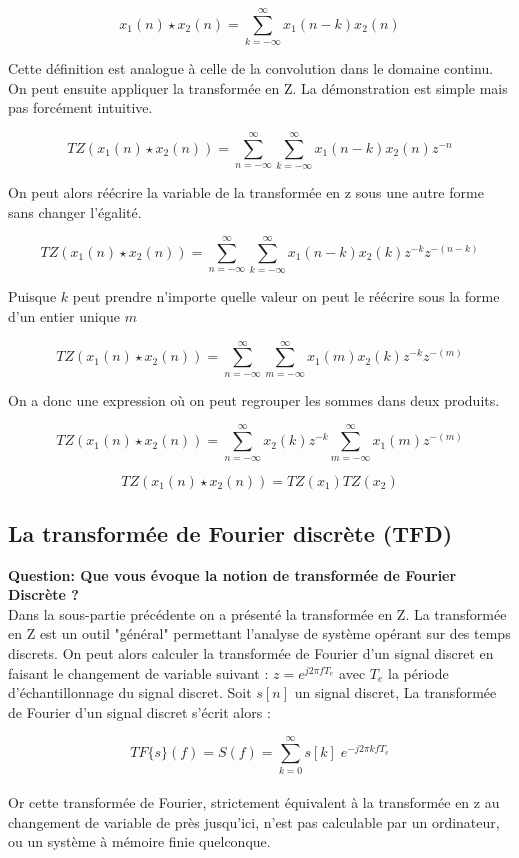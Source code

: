 \documentclass[11pt,a4paper]{article}
\begin{document}
\[ x_1(n) \star x_2(n)=  \sum_{k = -\infty}^{\infty} x_1(n-k)x_2(n) \]

Cette définition est analogue à celle de la convolution dans le domaine continu. On peut ensuite appliquer la transformée en Z. La démonstration est simple mais pas forcément intuitive.

\[ TZ(x_1(n) \star x_2(n)) = \sum_{n = -\infty}^{\infty} \sum_{k = -\infty}^{\infty} x_1(n-k)x_2(n) z^{-n}\]

On peut alors réécrire la variable de la transformée en z sous une autre forme sans changer l'égalité.

\[ TZ(x_1(n) \star x_2(n)) = \sum_{n = -\infty}^{\infty} \sum_{k = -\infty}^{\infty} x_1(n-k)x_2(k) z^{-k}  z^{-(n-k)}\]

Puisque $k$ peut prendre n'importe quelle valeur on peut le réécrire sous la forme d'un entier unique $m$ 

\[ TZ(x_1(n) \star x_2(n)) = \sum_{n = -\infty}^{\infty} \sum_{m = -\infty}^{\infty} x_1(m)x_2(k) z^{-k}  z^{-(m)}\]

On a donc une expression où on peut regrouper les sommes dans deux produits.

\[ TZ(x_1(n) \star x_2(n)) = \sum_{n = -\infty}^{\infty} x_2(k)z^{-k} \sum_{m = -\infty}^{\infty} x_1(m)   z^{-(m)}\]

\[ TZ(x_1(n) \star x_2(n)) = TZ(x_1) TZ(x_2)\]

\subsection{La transformée de Fourier discrète (TFD)}

\textbf{Question: Que vous évoque la notion de transformée de Fourier Discrète ?}\\

Dans la sous-partie précédente on a présenté la transformée en Z. La transformée en Z est un outil "général" permettant l'analyse de système  opérant sur des temps discrets. On peut alors calculer la transformée de Fourier d'un signal discret en faisant le changement de variable suivant : $z = e^{j2\pi f T_e}$ avec $T_e$ la période d'échantillonnage du signal discret. Soit $s[n]$ un signal discret, La transformée de Fourier d'un signal discret s'écrit alors : 

\[ TF\lbrace s \rbrace(f) = S(f) = \sum_{k = 0}^{\infty} s[k] \; e^{-j 2 \pi k f T_e}\] \\

Or cette transformée de Fourier, strictement équivalent à la transformée en z au changement de variable de près jusqu'ici, n'est pas calculable par un ordinateur, ou un système à mémoire finie quelconque.\\
\end{document}

